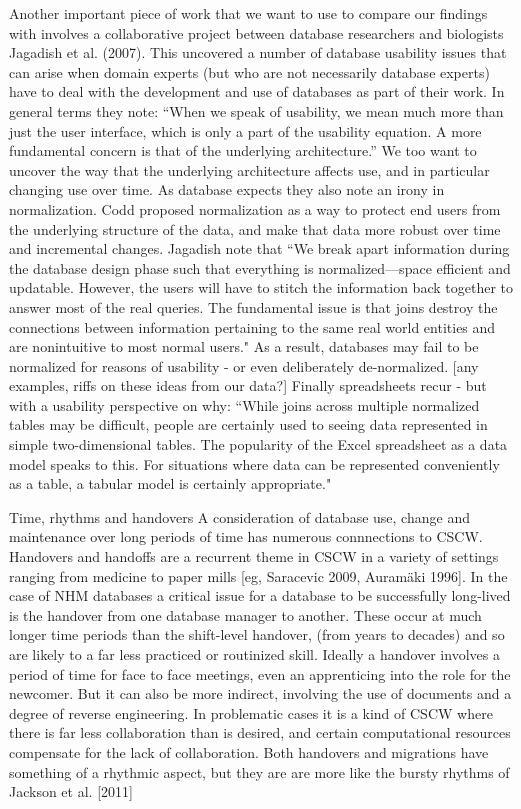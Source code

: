 Another important piece of work that we want to use to compare our findings with involves a collaborative project between database researchers and biologists Jagadish et al. (2007). This uncovered a number of database usability issues that can arise when domain experts (but who are not necessarily  database experts) have to deal with the development and use of databases as part of their work. In general terms they note: “When we speak of usability, we mean much more than just the user interface, which is only a part of the usability equation. A more fundamental concern is that of the underlying architecture.” We too want to uncover the way that the underlying architecture affects use, and in particular changing use over time. As database expects they also note an irony in normalization. Codd proposed normalization as a way to protect end users from the underlying structure of the data, and make that data more robust over time and incremental changes. Jagadish note that “We break apart information during the database design phase such that everything is normalized—space efficient and updatable. However, the users will have to stitch the information back together to answer most of the real queries. The fundamental issue is that joins destroy the connections between information pertaining to the same real world entities and are nonintuitive to most normal users." As a result, databases may fail to be normalized for reasons of usability - or even deliberately de-normalized. [any examples, riffs on these ideas from our data?] Finally spreadsheets recur - but with a usability perspective on why: “While joins across multiple normalized tables may be difficult, people are certainly used to seeing data represented in simple two-dimensional tables. The popularity of the Excel spreadsheet as a data model speaks to this. For situations where data can be represented conveniently as a table, a tabular model is certainly appropriate."

Time, rhythms and handovers
A consideration of database use, change and maintenance over long periods of time has numerous connnections to CSCW. Handovers and handoffs are a recurrent theme in CSCW in a variety of settings ranging from medicine to paper mills [eg, Saracevic 2009, Auramäki 1996]. In the case of NHM databases a critical issue for a database to be successfully long-lived is the handover from one database manager to another. These occur at much longer time periods than the shift-level handover, (from years to decades) and so are likely to a far less practiced or routinized skill. Ideally a handover involves a period of time for face to face meetings, even an apprenticing into the role for the newcomer. But it can also be more indirect, involving the use of documents and a degree of reverse engineering. In problematic cases it is a kind of CSCW where there is far less collaboration than is desired, and certain computational resources compensate for the lack of collaboration. Both handovers and migrations have something of a rhythmic aspect, but they are are more like the bursty rhythms of Jackson et al. [2011]
